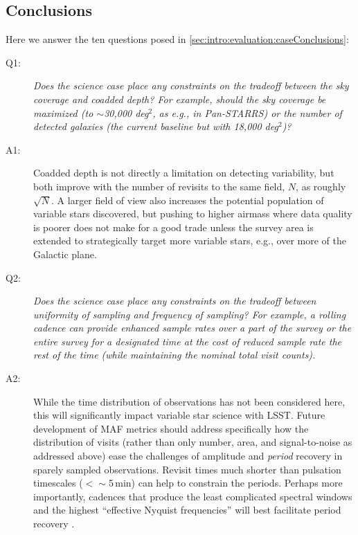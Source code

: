 
 \subsection{Conclusions}

 Here we answer the ten questions posed in
 \autoref{sec:intro:evaluation:caseConclusions}:

 \begin{description}

 \item[Q1:] {\it Does the science case place any constraints on the
 tradeoff between the sky coverage and coadded depth? For example, should
 the sky coverage be maximized (to $\sim$30,000 deg$^2$, as e.g., in
 Pan-STARRS) or the number of detected galaxies (the current baseline but
 with 18,000 deg$^2$)?}

 \item[A1:] Coadded depth is not directly a limitation on detecting variability,
 but both improve with the number of revisits to the same field, $N$,
 as roughly $\sqrt{N}$.  A larger field of view also increases the potential population
 of variable stars discovered, but pushing to higher airmass where data quality is
 poorer does not make for a good trade unless the survey area is extended to strategically
 target more variable stars, e.g., over more of the Galactic plane.

 \item[Q2:] {\it Does the science case place any constraints on the
 tradeoff between uniformity of sampling and frequency of  sampling? For
 example, a rolling cadence can provide enhanced sample rates over a part
 of the survey or the entire survey for a designated time at the cost of
 reduced sample rate the rest of the time (while maintaining the nominal
 total visit counts).}

 \item[A2:] While the time distribution of observations has not been considered
 here, this will significantly impact variable star science with LSST.
 Future development of MAF metrics should address specifically how
 the distribution of visits (rather than only number, area, and signal-to-noise as addressed
 above) ease the challenges of amplitude and \emph{period} recovery in sparely sampled
 observations.  Revisit times much shorter than pulsation timescales ($< \sim$5\,min)
 can help to constrain the periods.  Perhaps more importantly, cadences that
 produce the least complicated spectral windows and the highest
 ``effective Nyquist frequencies'' will best facilitate period recovery \citep[e.g.,][]{1999A&AS..135....1E}.


\end{description}
